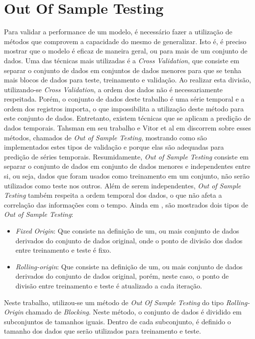 \section{Out Of Sample Testing}
Para validar a performance de um modelo, é necessário fazer a utilização de métodos que comprovem a capacidade do mesmo de generalizar. Isto é, é preciso mostrar que o modelo é eficaz de maneira geral, ou para mais de um conjunto de dados. Uma das técnicas mais utilizadas é a \textit{Cross Validation}, que consiste em separar o conjunto de dados em conjuntos de dados menores para que se tenha mais blocos de dados para teste, treinamento e validação. Ao realizar esta divisão, utilizando-se \textit{Cross Validation}, a ordem dos dados não é necessariamente respeitada. Porém, o conjunto de dados deste trabalho é uma série temporal e a ordem dos registros importa, o que impossibilita a utilização deste método para este conjunto de dados. Entretanto, existem técnicas que se aplicam a predição de dados temporais. Tahsman em seu trabalho \cite{Tashman_2000} e Vitor et al em \cite{Vitor_2019} discorrem sobre esses métodos, chamados de \textit{Out of Sample Testing}, mostrando como são implementados estes tipos de validação e porque elas são adequadas para predição de séries temporais. Resumidamente, \textit{Out of Sample Testing} consiste em separar o conjunto de dados em conjunto de dados menores e independentes entre si, ou seja, dados que foram usados como treinamento em um conjunto, não serão utilizados como teste nos outros. Além de serem independentes, \textit{Out of Sample Testing} também respeita a ordem temporal dos dados, o que não afeta a correlação das informações com o tempo. Ainda em \cite{Tashman_2000}, são mostrados dois tipos de \textit{Out of Sample Testing}:

\begin{itemize}
    \item \textit{Fixed Origin}: Que consiste na definição de um, ou mais conjunto de dados derivados do conjunto de dados original, onde o ponto de divisão dos dados entre treinamento e teste é fixo.
    \item \textit{Rolling-origin}: Que consiste na definição de um, ou mais conjunto de dados derivados do conjunto de dados original, porém, neste caso, o ponto de divisão entre treinamento e teste é atualizado a cada iteração.
\end{itemize}

Neste trabalho, utilizou-se um método de \textit{Out Of Sample Testing} do tipo \textit{Rolling-Origin} chamado de \textit{Blocking}. Neste método, o conjunto de dados é dividido em subconjuntos de tamanhos iguais. Dentro de cada subconjunto, é definido o tamanho dos dados que serão utilizados para treinamento e teste.

